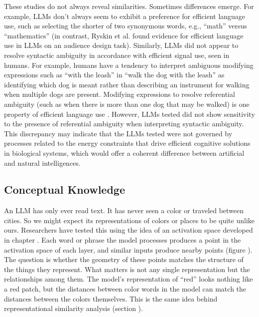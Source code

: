 These studies do not always reveal similarities. Sometimes differences emerge.
For example, LLMs don't
always seem to exhibit a preference for efficient language use, such as selecting the
shorter of two synonymous words, e.g.,  ``math'' versus ``mathematics''  \cite{cai2023do} (in contrast, Ryskin et al. \cite{RyskinEtAl2025EfficientAudienceDesign} found evidence for efficient language use in LLMs on an audience design task).
Similarly,  LLMs did not appear to resolve syntactic ambiguity in accordance
with efficient signal use, seen in humans. For example, humans have a tendency
to interpret ambiguous modifying expressions such as ``with the leash'' in
``walk the dog with the leash'' as identifying which dog is meant rather than
describing an instrument for walking when multiple dogs are present. Modifying
expressions to resolve referential ambiguity (such as when there is more than
one dog that may be walked) is one property of efficient language use
\cite{frank2012predicting}. However, LLMs tested did not show sensitivity to
the presence of referential ambiguity when interpreting syntactic ambiguity.
This discrepancy may indicate that the LLMs tested were not governed by processes
related to the energy constraints that drive efficient cognitive solutions in
biological systems, which would offer a coherent difference between artificial
and natural intelligences.

\subsection{Conceptual Knowledge}\label{llmConceptualKnowledge}

An LLM has only ever read text. It has never seen a color or traveled between
cities. So we might expect its representations of colors or places to be
quite unlike ours.
Researchers have tested this using the idea of an activation space developed
in chapter . Each word or phrase the model processes
produces a point in the activation space of each layer, and similar inputs
produce nearby points (figure ). The question is whether
the geometry of these points matches the structure of the things they
represent. What matters is not any single representation but the relationships among them. The
model's representation of ``red'' looks nothing like a red patch, but the
distances between color words in the model can match the distances between the
colors themselves. This is the same idea behind representational
similarity analysis (section ).

